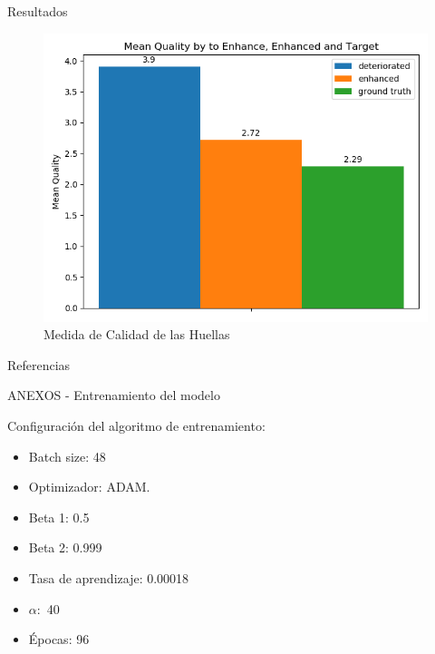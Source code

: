 \documentclass[12pt,aspectratio=169]{beamer}
\begin{document}
\begin{frame}{Resultados}

    \begin{figure}[h]
        \includegraphics[scale=0.52]{figs/mean_qualities.png}
        \caption{Medida de Calidad de las Huellas}
    \end{figure}
    
\end{frame}

\nocite{*}
\begin{frame}[allowframebreaks]{Referencias}


\end{frame}


\begin{frame}{ANEXOS - Entrenamiento del modelo}

     Configuración del algoritmo de entrenamiento:
     \vspace{5mm}
     
     \begin{itemize}
        \item Batch size: 48
        \item Optimizador: ADAM.
        \item Beta 1: 0.5
        \item Beta 2: 0.999
        \item Tasa de aprendizaje: 0.00018
        \item $\alpha:$ 40
        \item Épocas: 96
    \end{itemize}
    
\end{frame}
\end{document}
